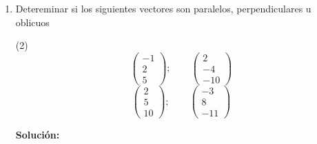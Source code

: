 \documentclass[12pt]{article}
\newenvironment{solucion}
{\begin{mdframed}[backgroundcolor=black!10]
		{\bf Solución:}\\
	}
	{
	\end{mdframed}
}
\newenvironment{preguntas}
{\begin{enumerate}\itemsep12pt
	}
	{
	\end{enumerate}
}
\begin{document}
\begin{preguntas}
\begin{solucion}
\begin{enumerate}[a)]
$$\begin{pmatrix}
			15\\
			-5\\
			-5
			\end{pmatrix}  + 3 \begin{pmatrix}
			2\\
			1\\
			5
			\end{pmatrix} = \begin{pmatrix}
			21\\
			-2\\
			10
			\end{pmatrix} $$
			Para obtener un vector perpendicular, podemos hacer producto cruz con cualquier otro vector arbitrario. Para hacer los calculos simples, utilizaremos
			$$v_7 = \begin{pmatrix}
			1\\
			0\\
			0
			\end{pmatrix} $$
			Luego, 
			$$v_8 = v_6 \times v_7 = \begin{pmatrix}
			21\\
			-2\\
			10
			\end{pmatrix} \times \begin{pmatrix}
			1\\
			0\\
			0
			\end{pmatrix} = 10j + 2k = \begin{pmatrix}
			0\\
			10\\
			2
			\end{pmatrix}$$
\end{enumerate}
\end{solucion}
\item Detereminar si los siguientes vectores son paralelos, perpendiculares u oblicuos
\begin{tasks}(2)
\task $$ 
			\begin{pmatrix}
			-1\\
			2\\
			5
		\end{pmatrix};\qquad
			\begin{pmatrix}
			2\\
			-4\\
			-10
		\end{pmatrix}$$
\task  $$ 
			\begin{pmatrix}
			2\\
			5\\
			10
		\end{pmatrix};\qquad
			\begin{pmatrix}
			-3\\
			8\\
			-11
		\end{pmatrix}$$
\end{tasks}
\begin{solucion}


\end{solucion}
\end{preguntas}
\end{document}
